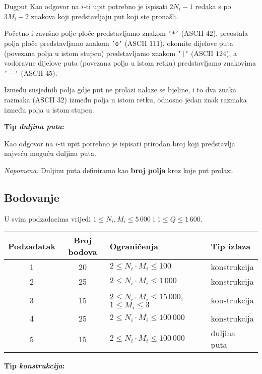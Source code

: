 \begin{statement}[
  problempoints=100,
  timelimit=5 sekundi,
  memorylimit=512 MiB,
]{Dugput}
Kao odgovor na $i$-ti upit potrebno je ispisati $2N_i-1$ redaka s po $3M_i-2$
znakova koji predstavljaju put koji ste pronašli.

Početno i završno polje ploče predstavljamo znakom \texttt{'*'} (ASCII $42$),
preostala polja ploče predstavljamo znakom \texttt{'o'} (ASCII $111$),
okomite dijelove puta (povezana polja u istom stupcu) predstavljamo znakom
\texttt{'|'} (ASCII $124$), a vodoravne dijelove puta (povezana polja u istom
retku) predstavljamo znakovima \texttt{'-{}-'} (ASCII $45$).

Između susjednih polja gdje put ne prolazi nalaze se bjeline, i to dva znaka
razmaka (ASCII $32$) između polja u istom retku, odnosno jedan znak razmaka
između polja u istom stupcu.

\textbf{Tip \textit{duljina puta}:}

Kao odgovor na $i$-ti upit potrebno je ispisati prirodan broj koji predstavlja
najveću moguću duljinu puta.

\textit{Napomena:} Duljinu puta definiramo kao \textbf{broj polja} kroz koje put prolazi.

\subsection*{Bodovanje}
U svim podzadacima vrijedi $1 \leq N_i, M_i \leq 5\,000$ i $1 \leq Q \leq 1\,600$.

{\renewcommand{\arraystretch}{1.4}
  \setlength{\tabcolsep}{6pt}
  \begin{tabular}{ccll}
  Podzadatak & Broj bodova & Ograničenja & Tip izlaza \\ \midrule
  1 & 20 & $2 \leq N_i \cdot M_i \leq 100$ & konstrukcija \\
  2 & 25 & $2 \leq N_i \cdot M_i \leq 1\,000$ & konstrukcija \\
  3 & 15 & $2 \leq N_i \cdot M_i \leq 15\,000$, $1 \leq M_i \leq 3$ & konstrukcija \\
  4 & 25 & $2 \leq N_i \cdot M_i \leq 100\,000$ & konstrukcija \\
  5 & 15 & $2 \leq N_i \cdot M_i \leq 100\,000$ & duljina puta \\
\end{tabular}}

\textbf{Tip \textit{konstrukcija}:}


\end{statement}
